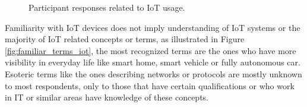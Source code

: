 \begin{figure}[H]
    \begin{center}
        \caption{Participant responses related to IoT usage.}
        \label{fig:internet_of_things_device_usage}
    \end{center}
\end{figure}



Familiarity with IoT devices does not imply understanding of IoT systems
or the majority of IoT related concepts or terms,
as illustrated in Figure \ref{fig:familiar_terms_iot},
the most recognized terms are the ones who have more visibility
in everyday life like smart home, smart vehicle or fully autonomous car.
Esoteric terms like the ones describing networks or protocols are mostly
unknown to most respondents, only to those that have certain
qualifications or who work in IT or similar areas have knowledge of these concepts.

